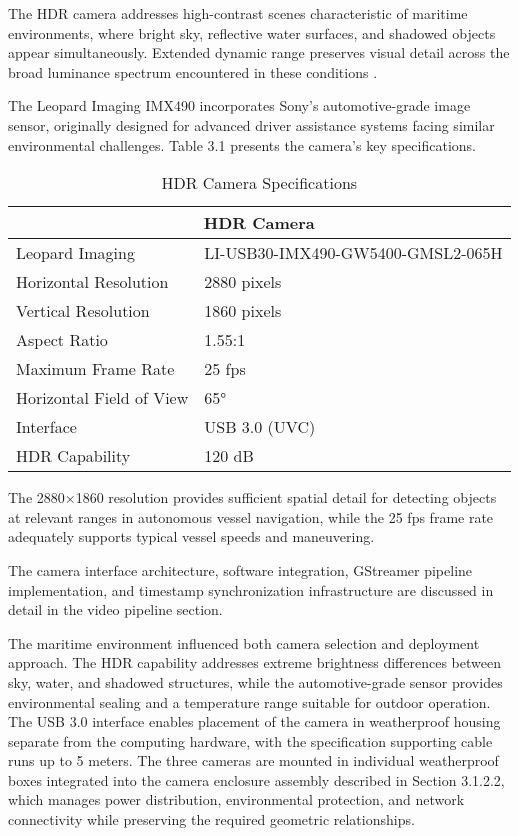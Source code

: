 \documentclass{erauthesis}
\begin{document}
The \ac{HDR} camera addresses high-contrast scenes characteristic of maritime environments, where bright sky, reflective water surfaces, and shadowed objects appear simultaneously.
Extended dynamic range preserves visual detail across the broad luminance spectrum encountered in these conditions \cite{thompson2023}.

The Leopard Imaging IMX490 incorporates Sony's automotive-grade image sensor, originally designed for advanced driver assistance systems facing similar environmental challenges.
Table 3.1 presents the camera's key specifications.

\begin{table}[h]
\centering
\caption{HDR Camera Specifications}
\begin{tabular}{ll}
\hline
\multicolumn{2}{c}{HDR Camera}\\
\hline
\hline
Leopard Imaging & LI-USB30-IMX490-GW5400-GMSL2-065H \\
Horizontal Resolution & 2880 pixels \\
Vertical Resolution & 1860 pixels \\
Aspect Ratio & 1.55:1 \\
Maximum Frame Rate & 25 fps \\
Horizontal Field of View & 65° \\
Interface & USB 3.0 (UVC) \\
HDR Capability & 120 dB \\
\hline
\end{tabular}
\label{tab:hdr_camera_specs}
\end{table}

The 2880×1860 resolution provides sufficient spatial detail for detecting objects at relevant ranges in autonomous vessel navigation, while the 25 fps frame rate adequately supports typical vessel speeds and maneuvering.

The camera interface architecture, software integration, GStreamer pipeline implementation, and timestamp synchronization infrastructure are discussed in detail in the video pipeline section.

The maritime environment influenced both camera selection and deployment approach.
The \ac{HDR} capability addresses extreme brightness differences between sky, water, and shadowed structures, while the automotive-grade sensor provides environmental sealing and a temperature range suitable for outdoor operation.
The USB 3.0 interface enables placement of the camera in weatherproof housing separate from the computing hardware, with the specification supporting cable runs up to 5 meters.
The three cameras are mounted in individual weatherproof boxes integrated into the camera enclosure assembly described in Section 3.1.2.2, which manages power distribution, environmental protection, and network connectivity while preserving the required geometric relationships.
\end{document}
